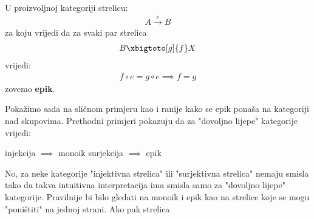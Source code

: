   \begin{definition}
    U proizvoljnoj kategoriji  strelicu:
    \begin{align*}
      A \xrightarrow{e} B
    \end{align*}
    za koju vrijedi da za svaki par strelica
    \begin{align*}
      B \xbigtoto[g]{f} X
    \end{align*}
    vrijedi:
    \begin{align}
      f \circ e = g \circ e \implies f = g
    \end{align}
    zovemo \textbf{epik}.
  \end{definition}
  Pokažimo sada na sličnom primjeru kao i ranije kako se epik ponaša na
  kategoriji nad skupovima.
    Prethodni primjeri pokazuju da za "dovoljno lijepe" kategorije vrijedi:
    \begin{center}
      injekcija $\implies$ monoik \qquad surjekcija $\implies$ epik
    \end{center}
    No, za neke kategorije "injektivna strelica" ili "surjektivna strelica"
    nemaju smisla tako da takva intuitivna interpretacija ima smisla samo za
    "dovoljno lijepe" kategorije. Pravilnije bi bilo gledati na monoik i epik
    kao na strelice koje se mogu "poništiti" na jednoj strani. Ako pak strelica
